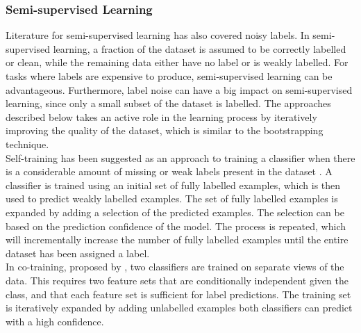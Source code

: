 



\subsubsection{Semi-supervised Learning}
Literature for semi-supervised learning has also covered noisy labels. In semi-supervised learning, a fraction of the dataset is assumed to be correctly labelled or clean, while the remaining data either have no label or is weakly labelled. For tasks where labels are expensive to produce, semi-supervised learning can be advantageous. Furthermore, label noise can have a big impact on semi-supervised learning, since only a small subset of the dataset is labelled. The approaches described below takes an active role in the learning process by iteratively improving the quality of the dataset, which is similar to the bootstrapping technique.\\

Self-training has been suggested as an approach to training a classifier when there is a considerable amount of missing or weak labels present in the dataset \citep{Rosenberg_self-training}. A classifier is trained using an initial set of fully labelled examples, which is then used to predict weakly labelled examples. The set of fully labelled examples is expanded by adding a selection of the predicted examples. The selection can be based on the prediction confidence of the model. The process is repeated, which will incrementally increase the number of fully labelled examples until the entire dataset has been assigned a label. \\

In co-training, proposed by \cite{Blum_co-training}, two classifiers are trained on separate views of the data. This requires two feature sets that are conditionally independent given the class, and that each feature set is sufficient for label predictions. The training set is iteratively expanded by adding unlabelled examples both classifiers can predict with a high confidence. \\

